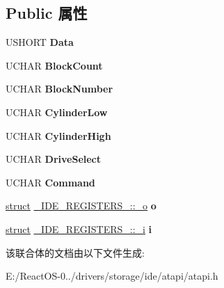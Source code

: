 \subsection*{Public 属性}
\begin{DoxyCompactItemize}
\item 
\mbox{\label{struct___i_d_e___r_e_g_i_s_t_e_r_s__1_ad4448409076dd03f7d4606aae9667520}} 
U\+S\+H\+O\+RT {\bfseries Data}
\item 
\mbox{\label{struct___i_d_e___r_e_g_i_s_t_e_r_s__1_a78547e81bb5bc5c638bbe40b6e56874a}} 
U\+C\+H\+AR {\bfseries Block\+Count}
\item 
\mbox{\label{struct___i_d_e___r_e_g_i_s_t_e_r_s__1_ace6b1e9319aac6ff7689757574626700}} 
U\+C\+H\+AR {\bfseries Block\+Number}
\item 
\mbox{\label{struct___i_d_e___r_e_g_i_s_t_e_r_s__1_acb1abfc0d40069f6ebdd55e16d5e2561}} 
U\+C\+H\+AR {\bfseries Cylinder\+Low}
\item 
\mbox{\label{struct___i_d_e___r_e_g_i_s_t_e_r_s__1_a02ae5fe7c0a202d048b9d39eec2d3ab8}} 
U\+C\+H\+AR {\bfseries Cylinder\+High}
\item 
\mbox{\label{struct___i_d_e___r_e_g_i_s_t_e_r_s__1_ad20b26243c8f8a71cda0ab67f7104e94}} 
U\+C\+H\+AR {\bfseries Drive\+Select}
\item 
\mbox{\label{struct___i_d_e___r_e_g_i_s_t_e_r_s__1_ac02d5cf80550f40ea5332e1835061bff}} 
U\+C\+H\+AR {\bfseries Command}
\item 
\mbox{\label{struct___i_d_e___r_e_g_i_s_t_e_r_s__1_afb6476f9374efc326134e271b943804f}} 
\hyperlink{interfacestruct}{struct} \hyperlink{struct___i_d_e___r_e_g_i_s_t_e_r_s__1_1_1__o}{\+\_\+\+I\+D\+E\+\_\+\+R\+E\+G\+I\+S\+T\+E\+R\+S\+\_\+::\+\_\+o} {\bfseries o}
\item 
\mbox{\label{struct___i_d_e___r_e_g_i_s_t_e_r_s__1_a1f012b886716440ebbe334874daba2de}} 
\hyperlink{interfacestruct}{struct} \hyperlink{struct___i_d_e___r_e_g_i_s_t_e_r_s__1_1_1__i}{\+\_\+\+I\+D\+E\+\_\+\+R\+E\+G\+I\+S\+T\+E\+R\+S\+\_\+::\+\_\+i} {\bfseries i}
\end{DoxyCompactItemize}


该联合体的文档由以下文件生成\+:\begin{DoxyCompactItemize}
\item 
E\+:/\+React\+O\+S-\/0../drivers/storage/ide/atapi/atapi.\+h\end{DoxyCompactItemize}
